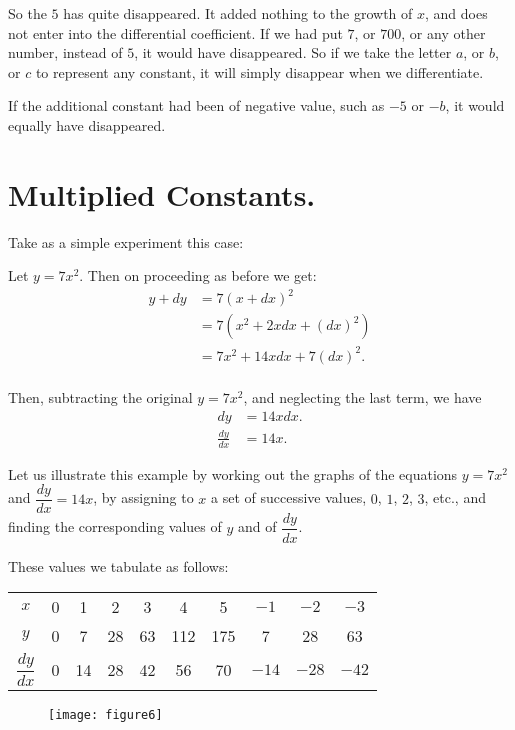 \documentclass{ximera}
\begin{document}
{{So the $5$ has quite disappeared. It added nothing
to the growth of $x$, and does not enter into the
differential coefficient. If we had put $7$, or $700$, or
any other number, instead of $5$, it would have disappeared.
So if we take the letter $a$, or $b$, or $c$ to
represent any constant, it will simply disappear when
we differentiate.

If the additional constant had been of negative value,
such as $-5$ or $-b$, it would equally have disappeared.


\section{Multiplied Constants.}
Take as a simple experiment this case:

Let $y = 7x^2$.
Then on proceeding as before we get:
\begin{align*}
y + dy &= 7(x+dx)^2 \\
       &= 7(x^2 + 2xdx + (dx)^2) \\
       &= 7x^2 + 14xdx + 7(dx)^2. \\
\end{align*}

Then, subtracting the original $y = 7x^2$, and neglecting
the last term, we have
\begin{align*}
dy &= 14xdx.\\
\frac{dy}{dx} &= 14x.
\end{align*}

Let us illustrate this example by working out the
graphs of the equations $y = 7x^2$ and $\dfrac{dy}{dx} = 14x$, by
assigning to $x$ a set of successive values, $0$, $1$, $2$, $3$, etc.,
and finding the corresponding values of $y$ and of $\dfrac{dy}{dx}$.

These values we tabulate as follows:

\begin{tabular}{cccccccccc}
$x$ & 0 & 1 & 2 & 3 & 4 & 5 & $-1$ & $-2$ & $-3$ \\
$y$ & 0 & 7 & 28 & 63 & 112 & 175 & 7 & 28 & 63 \\
$\dfrac{dy}{dx}$ & 0 & 14 & 28 & 42 & 56 & 70 & $-14$ & $-28$ & $-42$ \\ 
\end{tabular}


\newpage

\begin{figure}[h!]
\centering
\texttt{[image: figure6]}
\end{figure}

}}
\end{document}

